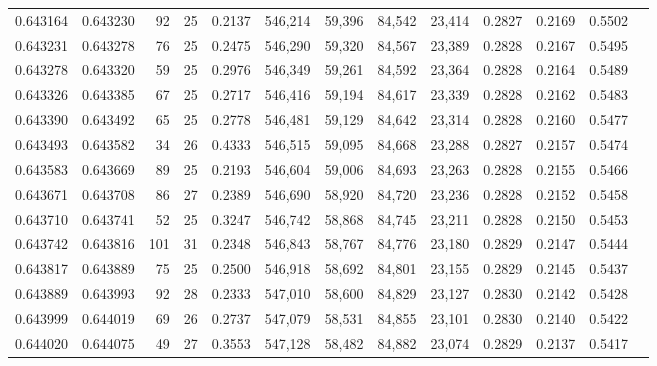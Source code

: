 \begin{tabular}{rrrrrrrrrrrrr}
0.643164 & 0.643230 &  92 &  25 &                                     0.2137 & 546,214 &  59,396 &  84,542 &  23,414 & 0.2827 & 0.2169 & 0.5502 \\
0.643231 & 0.643278 &  76 &  25 &                                     0.2475 & 546,290 &  59,320 &  84,567 &  23,389 & 0.2828 & 0.2167 & 0.5495 \\
0.643278 & 0.643320 &  59 &  25 &                                     0.2976 & 546,349 &  59,261 &  84,592 &  23,364 & 0.2828 & 0.2164 & 0.5489 \\
0.643326 & 0.643385 &  67 &  25 &                                     0.2717 & 546,416 &  59,194 &  84,617 &  23,339 & 0.2828 & 0.2162 & 0.5483 \\
0.643390 & 0.643492 &  65 &  25 &                                     0.2778 & 546,481 &  59,129 &  84,642 &  23,314 & 0.2828 & 0.2160 & 0.5477 \\
0.643493 & 0.643582 &  34 &  26 &                                     0.4333 & 546,515 &  59,095 &  84,668 &  23,288 & 0.2827 & 0.2157 & 0.5474 \\
0.643583 & 0.643669 &  89 &  25 &                                     0.2193 & 546,604 &  59,006 &  84,693 &  23,263 & 0.2828 & 0.2155 & 0.5466 \\
0.643671 & 0.643708 &  86 &  27 &                                     0.2389 & 546,690 &  58,920 &  84,720 &  23,236 & 0.2828 & 0.2152 & 0.5458 \\
0.643710 & 0.643741 &  52 &  25 &                                     0.3247 & 546,742 &  58,868 &  84,745 &  23,211 & 0.2828 & 0.2150 & 0.5453 \\
0.643742 & 0.643816 & 101 &  31 &                                     0.2348 & 546,843 &  58,767 &  84,776 &  23,180 & 0.2829 & 0.2147 & 0.5444 \\
0.643817 & 0.643889 &  75 &  25 &                                     0.2500 & 546,918 &  58,692 &  84,801 &  23,155 & 0.2829 & 0.2145 & 0.5437 \\
0.643889 & 0.643993 &  92 &  28 &                                     0.2333 & 547,010 &  58,600 &  84,829 &  23,127 & 0.2830 & 0.2142 & 0.5428 \\
0.643999 & 0.644019 &  69 &  26 &                                     0.2737 & 547,079 &  58,531 &  84,855 &  23,101 & 0.2830 & 0.2140 & 0.5422 \\
0.644020 & 0.644075 &  49 &  27 &                                     0.3553 & 547,128 &  58,482 &  84,882 &  23,074 & 0.2829 & 0.2137 & 0.5417 \\

\end{tabular}
